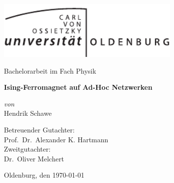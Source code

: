 \begin{titlepage}
\begin{center}

\includegraphics[width=90mm]{images/Uniol_1c.pdf}\\
\vspace{25mm}

{\LARGE  Bachelorarbeit im Fach Physik\\}

\vspace{10mm}

{\LARGE \bfseries
Ising-Ferromagnet auf Ad-Hoc Netzwerken
\\}

\vspace{20mm}

\begin{minipage}{0.4\textwidth}
\begin{center} \large
\emph{von}\\
\large
Hendrik Schawe\\
\end{center}
\end{minipage}

\vspace{45mm}

{\large
Betreuender Gutachter:\\
Prof.\ Dr.\ Alexander K. Hartmann\\
}
\vspace{8mm}
{\large
Zweitgutachter:\\
Dr.\ Oliver Melchert\\
}

\vfill
{\large Oldenburg, den \today}
\newpage

\end{center}

\end{titlepage}
